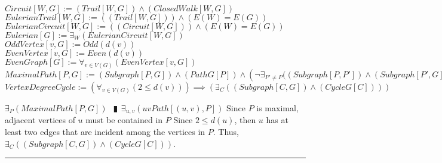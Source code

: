 \documentclass{book}
\newcommand{\abr}{:=}
\newcommand{\pipe}{$\phantom{(}\vrectangleblack\phantom{)}$}
\newcommand{\pr}[1]{\left(#1\right)}
\begin{document}
$Circuit[W, G] \abr (Trail[W, G]) \land (ClosedWalk[W, G])$ \\
$EulerianTrail[W, G] \abr \pr{(Trail[W, G])} \land \pr{E(W) = E(G)}$ \\
$EulerianCircuit[W, G] \abr \pr{(Circuit[W, G])} \land \pr{E(W) = E(G)}$ \\
$Eulerian[G] \abr \exists_{W}(EulerianCircuit[W, G])$ \\

$OddVertex[v, G] \abr Odd\pr{d(v)}$ \\
$EvenVertex[v, G] \abr Even\pr{d(v)}$ \\
$EvenGraph[G] \abr \forall_{v \in V(G)}(EvenVertex[v, G])$ \\

$MaximalPath[P, G] \abr (Subgraph[P, G]) \land (PathG[P]) \land \pr{\lnot \exists_{P' \neq P}((Subgraph[P, P']) \land (Subgraph[P', G]) \land (PathG[P'])}$ \\

$VertexDegreeCycle \abr \pr{\forall_{v \in V(G)}\pr{2 \leq d(v)}} \implies \pr{\exists_{C}\pr{(Subgraph[C, G]) \land (CycleG[C])}}$
\begin{enumerate}
  \lit $\exists_{P}(MaximalPath[P, G])$ \pipe $\exists_{u, v}\pr{uvPath[(u, v), P]}$
  \lit Since $P$ is maximal, adjacent vertices of $u$ must be contained in $P$
  \lit Since $2 \leq d(u)$, then $u$ has at least two edges that are incident among the vertices in $P$. Thus, $\exists_{C}\pr{(Subgraph[C, G]) \land (CycleG[C])}$.   
\end{enumerate} \vspace{.75mm} \hrule \vspace{.75mm} \ \\ 
\end{document}
